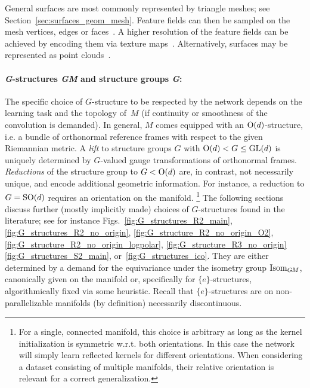 General surfaces are most commonly represented by triangle meshes; see Section~\ref{sec:surfaces_geom_mesh}.
Feature fields can then be sampled on the mesh vertices, edges or faces~\cite{deGoes2016VectorFieldProcessing}.
A higher resolution of the feature fields can be achieved by encoding them via texture maps~\cite{li2019crossAtlas,huang2019texturenet}.
Alternatively, surfaces may be represented as point clouds~\cite{tatarchenko2018tangent,jin2019NPTCnet}.






\paragraph{\textit{G}-structures \textit{GM} and structure groups \textit{G}:}
The specific choice of $G$-structure to be respected by the network depends on the learning task and the topology of~$M$ (if continuity or smoothness of the convolution is demanded).
In general, $M$ comes equipped with an $\operatorname{O}(d)$-structure, i.e. a bundle of orthonormal reference frames with respect to the given Riemannian metric.
A \emph{lift} to structure groups $G$ with ${\operatorname{O}(d) < G \leq \operatorname{GL}(d)}$ is uniquely determined by $G$-valued gauge transformations of orthonormal frames.
\emph{Reductions} of the structure group to $G < \operatorname{O}(d)$ are, in contrast, not necessarily unique, and encode additional geometric information.
For instance, a reduction to $G=\operatorname{SO}(d)$ requires an orientation on the manifold.%
\footnote{
    For a single, connected manifold, this choice is arbitrary as long as the kernel initialization is symmetric w.r.t. both orientations.
    In this case the network will simply learn reflected kernels for different orientations.
    When considering a dataset consisting of multiple manifolds, their relative orientation is relevant for a correct generalization.
}
The following sections discuss further (mostly implicitly made) choices of $G$-structures found in the literature; see for instance
Figs.~\ref{fig:G_structures_R2_main},
\ref{fig:G_structures_R2_no_origin},
\ref{fig:G_structure_R2_no_origin_O2},
\ref{fig:G_structure_R2_no_origin_logpolar},
\ref{fig:G_structure_R3_no_origin}
\ref{fig:G_structures_S2_main},
or~\ref{fig:G_structures_ico}.
They are either determined by a demand for the equivariance under the isometry group $\operatorname{Isom}_{G\mkern-1.4muM}$, canonically given on the manifold or, specifically for $\{e\}$-structures, algorithmically fixed via some heuristic.
Recall that $\{e\}$-structures are on non-parallelizable manifolds (by definition) necessarily discontinuous.



